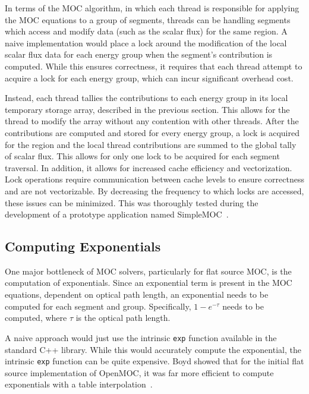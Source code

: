 In terms of the \ac{MOC} algorithm, in which each thread is responsible for applying the \ac{MOC} equations to a group of segments, threads can be handling segments which access and modify data (such as the scalar flux) for the same region. A naive implementation would place a lock around the modification of the local scalar flux data for each energy group when the segment's contribution is computed. While this ensures correctness, it requires that each thread attempt to acquire a lock for each energy group, which can incur significant overhead cost.

Instead, each thread tallies the contributions to each energy group in its local temporary storage array, described in the previous section. This allows for the thread to modify the array without any contention with other threads. After the contributions are computed and stored for every energy group, a lock is acquired for the region and the local thread contributions are summed to the global tally of scalar flux. This allows for only one lock to be acquired for each segment traversal. In addition, it allows for increased cache efficiency and vectorization. Lock operations require communication between cache levels to ensure correctness and are not vectorizable. By decreasing the frequency to which locks are accessed, these issues can be minimized. This was thoroughly tested during the development of a prototype application named SimpleMOC~\cite{simplemoc}.

\subsection{Computing Exponentials}

One major bottleneck of \ac{MOC} solvers, particularly for flat source \ac{MOC}, is the computation of exponentials. Since an exponential term is present in the \ac{MOC} equations, dependent on optical path length, an exponential needs to be computed for each segment and group. Specifically, $1-e^{-\tau}$ needs to be computed, where $\tau$ is the optical path length. 

A naive approach would just use the intrinsic \texttt{exp} function available in the standard C++ library. While this would accurately compute the exponential, the intrinsic \texttt{exp} function can be quite expensive. Boyd showed that for the initial flat source implementation of OpenMOC, it was far more efficient to compute exponentials with a table interpolation~\cite{boyd2014openmoc}. 


